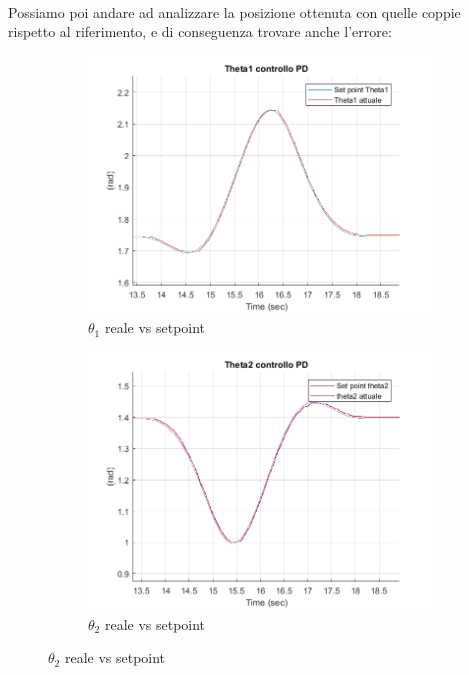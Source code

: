\\Possiamo poi andare ad analizzare la posizione ottenuta con quelle coppie rispetto al riferimento, e di conseguenza trovare anche l'errore:
\begin{figure}[!ht]
\begin{subfigure}{.5\textwidth}
  \centering
  \includegraphics[width=1\linewidth]{Immagini/Traiettorie/Theta1PD}  
  \caption{$\theta_1$ reale vs setpoint}
  \label{fig:sub-pd1p}
\end{subfigure}
\begin{subfigure}{.5\textwidth}
  \centering
  \includegraphics[width=1\linewidth]{Immagini/Traiettorie/Theta2PD}  
  \caption{$\theta_2$ reale vs setpoint}

\end{subfigure}
\end{figure}
